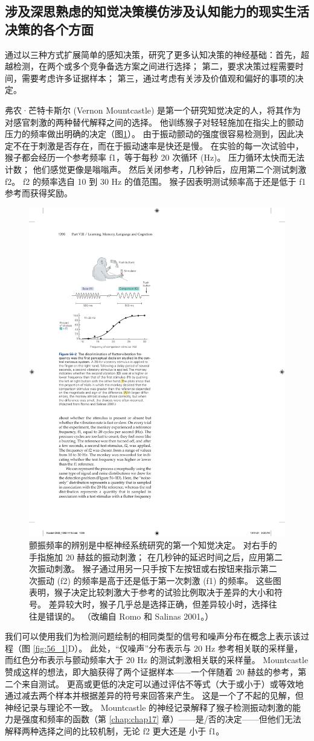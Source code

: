 \subsection{涉及深思熟虑的知觉决策模仿涉及认知能力的现实生活决策的各个方面}

通过以三种方式扩展简单的感知决策，研究了更多认知决策的神经基础：首先，超越检测，在两个或多个竞争备选方案之间进行选择； 第二，要求决策过程需要时间，需要考虑许多证据样本； 第三，通过考虑有关涉及价值观和偏好的事项的决定。

弗农·芒特卡斯尔 (Vernon Mountcastle) 是第一个研究知觉决定的人，将其作为对感官刺激的两种替代解释之间的选择。 他训练猴子对轻轻施加在指尖上的颤动压力的频率做出明确的决定（图\ref{fig:56_2}）。 由于振动颤动的强度很容易检测到，因此决定不在于刺激是否存在，而在于振动速率是快还是慢。 在实验的每一次试验中，猴子都会经历一个参考频率 f1，等于每秒 20 次循环 (Hz)。 压力循环太快而无法计数； 他们感觉更像是嗡嗡声。 然后关闭参考，几秒钟后，应用第二个测试刺激 f2。 f2 的频率选自 10 到 30 Hz 的值范围。 猴子因表明测试频率高于还是低于 f1 参考而获得奖励。

\begin{figure}[htbp]
	\centering
	\includegraphics[width=0.5\linewidth]{chap56/fig_56_2}
	\caption{颤振频率的辨别是中枢神经系统研究的第一个知觉决定。 对右手的手指施加 20 赫兹的振动刺激； 在几秒钟的延迟时间之后，应用第二次振动刺激。 猴子通过用另一只手按下左按钮或右按钮来指示第二次振动 (f2) 的频率是高于还是低于第一次刺激 (f1) 的频率。 这些图表明，猴子决定比较刺激大于参考的试验比例取决于差异的大小和符号。 差异较大时，猴子几乎总是选择正确，但差异较小时，选择往往是错误的。 （改编自 Romo 和 Salinas 2001。）}
	\label{fig:56_2}
\end{figure}

我们可以使用我们为检测问题绘制的相同类型的信号和噪声分布在概念上表示该过程（图 \ref{fig:56_1}D）。 此处，“仅噪声”分布表示与 20 Hz 参考相关联的采样量，而红色分布表示与颤动频率大于 20 Hz 的测试刺激相关联的采样量。 Mountcastle 赞成这样的想法，即大脑获得了两个证据样本——一个伴随着 20 赫兹的参考，第二个来自测试。 更高或更低的决定可以通过评估不等式（大于或小于）或等效地通过减去两个样本并根据差异的符号来回答来产生。 这是一个了不起的见解，但神经记录与理论不一致。 Mountcastle 的神经记录解释了猴子检测振动刺激的能力是强度和频率的函数（第 \ref{chap:chap17} 章）——是/否的决定——但他们无法解释两种选择之间的比较机制，无论 f2 更大还是 小于 f1。

